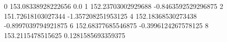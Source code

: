 0 153.08338928222656 0.0
1 152.23703002929688 -0.8463592529296875
2 151.72618103027344 -1.357208251953125
4 152.18368530273438 -0.8997039794921875
6 152.68377685546875 -0.3996124267578125
8 153.2115478515625 0.1281585693359375
